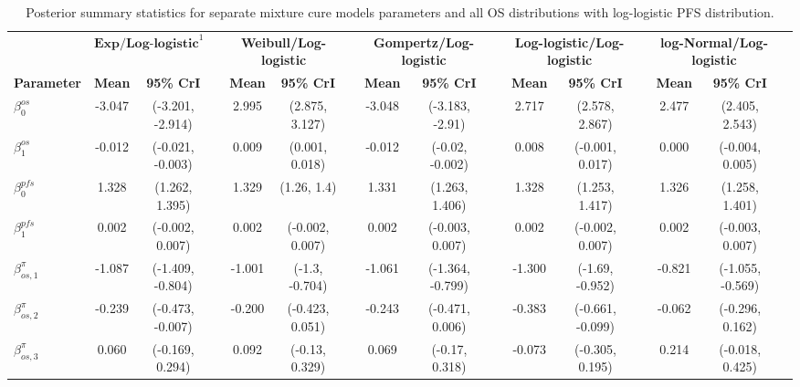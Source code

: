 \documentclass[AMA,STIX1COL]{WileyNJD-v2}
\begin{document}
\begin{landscape}
\begin{center}
\begin{table}[t]
\caption{Posterior summary statistics for separate mixture cure models parameters and all OS distributions with log-logistic PFS distribution. \label{tab:post_sep_pfs_llogistic}}
\centering
\begin{tabular}{l c c c c c c c c c c c c c c c}
\toprule
\multicolumn{1}{l}{} & \multicolumn{2}{c}{$\textbf{Exp/Log-logistic}^1$} & & \multicolumn{2}{c}{\textbf{Weibull/Log-logistic}} & & \multicolumn{2}{c}{\textbf{Gompertz/Log-logistic}} & & \multicolumn{2}{c}{\textbf{Log-logistic/Log-logistic}} & & \multicolumn{2}{c}{\textbf{log-Normal/Log-logistic}}\\
\cmidrule{2-3}\cmidrule{5-6}\cmidrule{8-9}\cmidrule{11-12}\cmidrule{14-15}
\textbf{Parameter} & \textbf{Mean} & \textbf{95\% CrI} & & \textbf{Mean} & \textbf{95\% CrI} & & \textbf{Mean} & \textbf{95\% CrI} & & \textbf{Mean} & \textbf{95\% CrI} & & \textbf{Mean} & \textbf{95\% CrI}\\
\midrule
$\beta^{os}_0$ & -3.047 & (-3.201, -2.914) &  & 2.995 & (2.875, 3.127) &  & -3.048 & (-3.183, -2.91) &  & 2.717 & (2.578, 2.867) &  & 2.477 & (2.405, 2.543) & \\
$\beta^{os}_1$ & -0.012 & (-0.021, -0.003) &  & 0.009 & (0.001, 0.018) &  & -0.012 & (-0.02, -0.002) &  & 0.008 & (-0.001, 0.017) &  & 0.000 & (-0.004, 0.005) & \\
$\beta^{pfs}_0$ & 1.328 & (1.262, 1.395) &  & 1.329 & (1.26, 1.4) &  & 1.331 & (1.263, 1.406) &  & 1.328 & (1.253, 1.417) &  & 1.326 & (1.258, 1.401) & \\
$\beta^{pfs}_1$ & 0.002 & (-0.002, 0.007) &  & 0.002 & (-0.002, 0.007) &  & 0.002 & (-0.003, 0.007) &  & 0.002 & (-0.002, 0.007) &  & 0.002 & (-0.003, 0.007) & \\
$\beta^{\pi}_{os, 1}$ & -1.087 & (-1.409, -0.804) &  & -1.001 & (-1.3, -0.704) &  & -1.061 & (-1.364, -0.799) &  & -1.300 & (-1.69, -0.952) &  & -0.821 & (-1.055, -0.569) & \\
$\beta^{\pi}_{os, 2}$ & -0.239 & (-0.473, -0.007) &  & -0.200 & (-0.423, 0.051) &  & -0.243 & (-0.471, 0.006) &  & -0.383 & (-0.661, -0.099) &  & -0.062 & (-0.296, 0.162) & \\
$\beta^{\pi}_{os, 3}$ & 0.060 & (-0.169, 0.294) &  & 0.092 & (-0.13, 0.329) &  & 0.069 & (-0.17, 0.318) &  & -0.073 & (-0.305, 0.195) &  & 0.214 & (-0.018, 0.425) & \\

\end{tabular}
\end{table}
\end{center}
\end{landscape}
\end{document}
